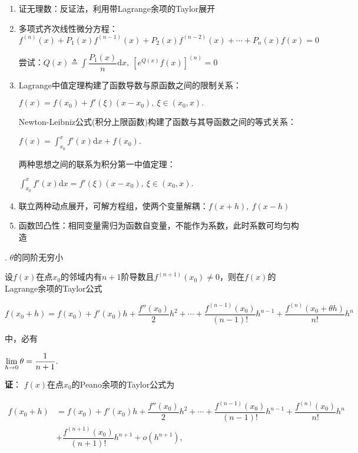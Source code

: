 \documentclass[UTF8]{ctexart}
\numberwithin{equation}{section}
\numberwithin{figure}{section}
\numberwithin{table}{section}
\newcommand\dif{\mathrm{d}}
\newcommand\no{\noindent}
\newcommand\dis{\displaystyle}
\newcommand\limit{\dis\lim\limits}
\newcommand\intd{\dis\int}
\begin{document}
\begin{spacing}{2}
\begin{enumerate}[itemindent=1.4em, label=(\arabic*)]
\item 证无理数：反证法，利用带Lagrange余项的Taylor展开

\item 多项式齐次线性微分方程：$f^{(n)}(x)+P_1(x)f^{(n-1)}(x)+P_2(x)f^{(n-2)}(x)
+\cdots+P_n(x)f(x)=0$

尝试：$Q(x)\triangleq\intd\dfrac{P_1(x)}{n}\dif x,\ \left[e^{Q(x)}f(x)\right]^{(n)}=0$

\item Lagrange中值定理构建了函数导数与原函数之间的限制关系：

\centerline{\textcolor[rgb]{0,0,1}{$f(x)=f(x_0)+f'(\xi)(x-x_0),\ \xi\in(x_0,x).$}}

Newton-Leibniz公式(积分上限函数)构建了函数与其导函数之间的等式关系：

\centerline{\textcolor[rgb]{0,0,1}{$f(x)=\intd_{x_0}^x f'(x)\dif x+f(x_0).$}}

两种思想之间的联系为积分第一中值定理：

\centerline{\textcolor[rgb]{0,0,1}{$\intd_{x_0}^x f'(x)\dif x=f'(\xi)(x-x_0),\ \xi\in(x_0,x).$}}

\item 联立两种动点展开，可解方程组，使两个变量解耦：$f(x+h),\ f(x-h)$

\item 函数凹凸性：相同变量需归为函数自变量，不能作为系数，此时系数可均匀构造

\end{enumerate}

\no4. $\theta$的同阶无穷小

设$f(x)$在点$x_0$的邻域内有$n+1$阶导数且$f^{(n+1)}(x_0)\neq0$，则在$f(x)$的Lagrange余项的Taylor公式

\centerline{$\dis f(x_0+h)=f(x_0)+f'(x_0)h+\dfrac{f''(x_0)}{2}h^2+\cdots+
\dfrac{f^{(n-1)}(x_0)}{(n-1)!}h^{n-1}+\dfrac{f^{(n)}(x_0+\theta h)}{n!}h^{n}$}

\no 中，必有

\centerline{$\dis\limit_{h\to0}\theta=\dfrac{1}{n+1}.$}

\textbf{证}：
$f(x)$在点$x_0$的Peano余项的Taylor公式为

\vspace{0.2cm}

\centerline{$\begin{aligned}\dis f(x_0+h)&=f(x_0)+f'(x_0)h+\dfrac{f''(x_0)}{2}h^2+\cdots+
\dfrac{f^{(n-1)}(x_0)}{(n-1)!}h^{n-1}+\dfrac{f^{(n)}(x_0)}{n!}h^{n}\\
&+\dfrac{f^{(n+1)}(x_0)}{(n+1)!}h^{n+1}+o(h^{n+1}),
\end{aligned}$}


\end{spacing}
\end{document}
